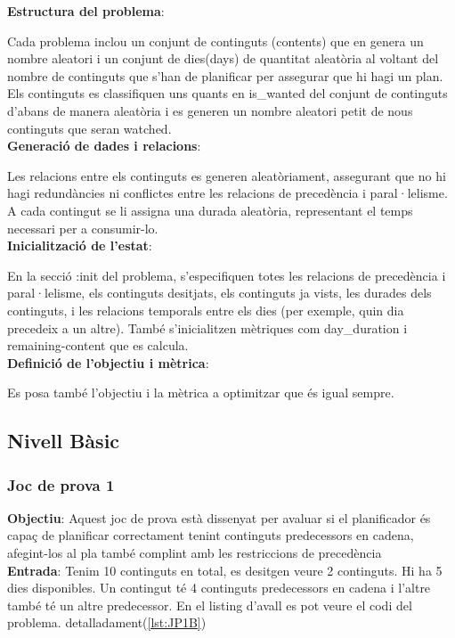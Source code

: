 \documentclass[a4paper]{article}
\begin{document}
	\noindent \textbf{Estructura del problema}:
	
	Cada problema inclou un conjunt de continguts (contents) que en genera un nombre aleatori  i un conjunt de dies(days) de quantitat aleatòria al voltant del nombre de continguts que s'han de planificar per assegurar que hi hagi un plan. Els continguts es classifiquen uns quants en is\_wanted del conjunt de continguts d'abans de manera aleatòria i es generen un nombre aleatori petit de nous continguts que seran watched. \\
	
	\noindent \textbf{Generació de dades i relacions}:
	
	Les relacions entre els continguts es generen aleatòriament, assegurant que no hi hagi redundàncies ni conflictes entre les relacions de precedència i paral·lelisme. A cada contingut se li assigna una durada aleatòria, representant el temps necessari per a consumir-lo. \\
	
	\noindent \textbf{Inicialització de l'estat}:
	
	En la secció :init del problema, s'especifiquen totes les relacions de precedència i paral·lelisme, els continguts desitjats, els continguts ja vists, les durades dels continguts, i les relacions temporals entre els dies (per exemple, quin dia precedeix a un altre). També s'inicialitzen mètriques com day\_duration i remaining-content que es calcula. \\
	
	\noindent \textbf{Definició de l'objectiu i mètrica}:
	
	Es posa també l'objectiu i la mètrica a optimitzar que és igual sempre.	
	
	\subsection{Nivell Bàsic}
	
	\subsubsection*{Joc de prova 1}
	\noindent \textbf{Objectiu}: Aquest joc de prova està dissenyat per avaluar si el planificador és capaç de planificar correctament tenint continguts predecessors en cadena, afegint-los al pla també complint amb les restriccions de precedència \\
	
	\noindent \textbf{Entrada}: Tenim 10 continguts en total, es desitgen veure 2 continguts. Hi ha 5 dies disponibles. Un contingut té 4 continguts predecessors en cadena i l'altre també té un altre predecessor. En el listing d'avall es pot veure el codi del problema.  detalladament(\ref{lst:JP1B}) \\
	
\end{document}
